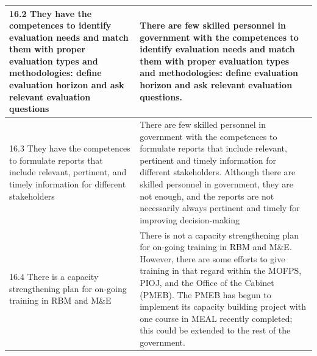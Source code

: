 \documentclass[
  10pt,
]{book}
\begin{document}
\begin{table}
\begin{tabular}[t]{l|l}
\hline
\hspace{1em}16.2 They have the competences to identify evaluation needs and match them with proper evaluation types and methodologies: define evaluation horizon and ask relevant evaluation questions & There are few skilled personnel in government with the competences to identify evaluation needs and match them with proper evaluation types and methodologies: define evaluation horizon and ask relevant evaluation questions.\\
\hline
\hspace{1em}16.3 They have the competences to formulate reports that include relevant, pertinent, and timely information for different stakeholders & There are few skilled personnel in government with the competences to formulate reports that include relevant, pertinent and timely information for different stakeholders. Although there are skilled personnel in government, they are not enough, and the reports are not necessarily always pertinent and timely for improving decision-making\\
\hline
\hspace{1em}16.4 There is a capacity strengthening plan for on-going training in RBM and M\&E & There is not a capacity strengthening plan for on-going training in RBM and M\&E. However, there are some efforts to give training in that regard within the MOFPS, PIOJ, and the Office of the Cabinet (PMEB). The PMEB has begun to implement its capacity building project with one course in MEAL recently completed; this could be extended to the rest of the government.\\
\hline
\end{tabular}
\end{table}
\end{document}
